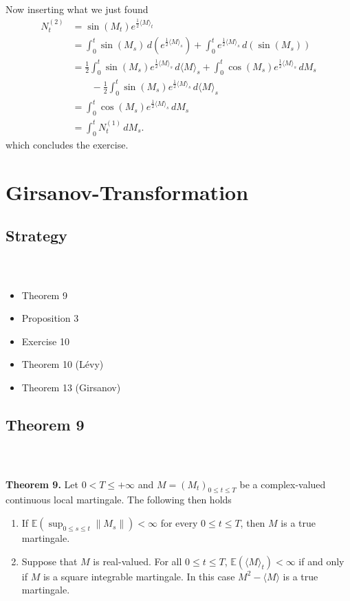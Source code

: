 \documentclass{beamer}
\numberwithin{equation}{section}
\newenvironment{frame2}{\begin{frame}\frametitle{{\normalsize \secname} \\ {\large \subsecname}}}{\end{frame}}
\begin{document}
\begin{frame2}
    Now inserting what we just found
    \begin{align*}
        N_t^{(2)} &= \sin(M_t)e^{\frac{1}{2}\langle M \rangle_t} \\
       &= \int_0^t \sin(M_s) \, d\left(e^{\frac{1}{2}\langle M \rangle_s}\right) + \int_0^t e^{\frac{1}{2}\langle M \rangle_s} \, d \left(\sin(M_s)\right) \\
       &= \frac{1}{2}\int_0^t\sin(M_s)e^{\frac{1}{2}\langle M \rangle_s}\, d\langle M \rangle_s + \int_0^t\cos(M_s)e^{\frac{1}{2}\langle M \rangle_s}\, dM_s \\
       &\qquad - \frac{1}{2}\int_0^t\sin(M_s)e^{\frac{1}{2}\langle M \rangle_s}\, d\langle M \rangle_s \\
       &= \int_0^t\cos(M_s)e^{\frac{1}{2}\langle M \rangle_s}\, dM_s \\
       &= \int_0^tN_t^{(1)} \, dM_s.
   \end{align*}
   which concludes the exercise.
\end{frame2}

\section{Girsanov-Transformation}

\subsection{Strategy}
\begin{frame2}
    \begin{itemize}
        \item Theorem 9
        \item Proposition 3
        \item Exercise 10
        \item Theorem 10 (Lévy)
        \item Theorem 13 (Girsanov)
    \end{itemize}
\end{frame2}

\subsection{Theorem 9}

\begin{frame2}
    \textbf{Theorem 9.}
    Let $0 < T \leq +\infty$ and $M = (M_t)_{0\leq t \leq T}$ be a complex-valued continuous local martingale.
    The following then holds
    \begin{enumerate}
        \item If $\mathbb{E}(\sup_{0 \leq s \leq t} \| M_s \|) < \infty$ for every $ 0 \leq t \leq T$, then $M$ is a true martingale.
        \item Suppose that $M$ is real-valued.
        For all $0 \leq t \leq T$, $\mathbb{E}(\langle M \rangle_t) < \infty$ if and only if $M$ is a square integrable martingale.
        In this case $M^2 - \langle M \rangle$ is a true martingale.
    \end{enumerate}
\end{frame2}
\end{document}
